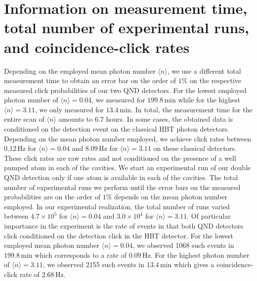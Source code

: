 \documentclass[prl,amsmath,amssymb,bibnotes,aps,longbibliography,12pt]{revtex4-1}
\newcommand{\braket}[1]{\langle{#1}\rangle}
\begin{document}
\section{Information on measurement time, total number of experimental runs, and coincidence-click rates}
Depending on the employed mean photon number $\braket{n}$, we use a different total measurement time to obtain an error bar on the order of $1\%$ on the respective measured click probabilities of our two QND detectors. For the lowest employed photon number of $\braket{n}=0.04$, we measured for $199.8\,\mathrm{min}$ while for the highest $\braket{n}=3.11$, we only measured for $13.4\,\mathrm{min}$. In total, the measurement time for the entire scan of $\braket{n}$ amounts to $6.7$ hours. In some cases, the obtained data is conditioned on the detection event on the classical HBT photon detectors. Depending on the mean photon number employed, we achieve click rates between $0.12\,\mathrm{Hz}$ for $\braket{n}=0.04$ and $8.09\,\mathrm{Hz}$ for $\braket{n}=3.11$ on these classical detectors. These click rates are raw rates and not conditioned on the presence of a well pumped atom in each of the cavities. We start an experimental run of our double QND detection only if one atom is available in each of the cavities. The total number of experimental runs we perform until the error bars on the measured probabilities are on the order of $1\%$ depends on the mean photon number employed. In our experimental realization, the total number of runs varied between $4.7\times10^5$ for $\braket{n}=0.04$ and $3.0\times10^4$ for $\braket{n}=3.11$. Of particular importance in the experiment is the rate of events in that both QND detectors click conditioned on the detection click in the HBT detector. For the lowest employed mean photon number $\braket{n}=0.04$, we observed 1068 such events in $199.8\,\mathrm{min}$ which corresponds to a rate of $0.09\,\mathrm{Hz}$. For the highest photon number of $\braket{n}=3.11$, we observed 2155 such events in $13.4\,\mathrm{min}$ which gives a coincidence-click rate of $2.68\,\mathrm{Hz}$.   
\end{document}
